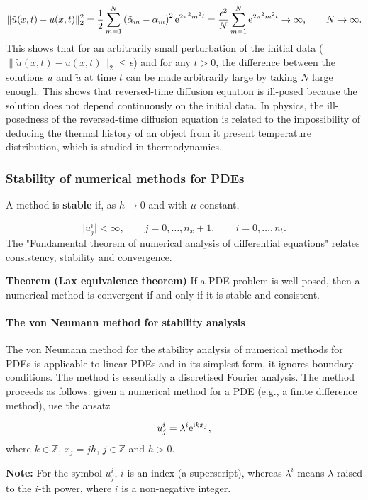 \documentclass[12pt,a4paper]{article}
\begin{document}
\[
\|\tilde{u}(x,t) - u(x,t)\|_2^2 =  \frac{1}{2}\sum_{m=1}^{N} \left(\tilde{\alpha}_m - \alpha_m\right)^2 {\rm e}^{2\pi^2 m^2 t} = \frac{\epsilon^2}{N}\sum_{m=1}^{N} {\rm e}^{2\pi^2 m^2 t} \to \infty, \qquad N\to \infty.
\]
This shows that for an arbitrarily small perturbation of the initial data ($\|\tilde{u}(x,t) - u(x,t)\|_2 \leq \epsilon$) and for any $t > 0$, the difference between the solutions $u$ and $\tilde{u}$ at time $t$ can be made arbitrarily large by taking $N$ large enough. This shows that reversed-time diffusion equation is ill-posed because the solution does not depend continuously on the initial data.  In physics, the ill-posedness of the reversed-time diffusion equation is related to the impossibility of deducing the thermal history of an object from it present temperature distribution, which is studied in thermodynamics.

\subsubsection{Stability of numerical methods for PDEs}
A method is \textbf{stable} if, as $h \to 0$ and with $\mu$ constant,

\[
\vert u^i_j \vert < \infty, \qquad    j = 0, \ldots, n_x+1, \qquad i = 0, \ldots, n_t.
\]
The "Fundamental theorem of numerical analysis of differential equations" relates consistency, stability and convergence.

\textbf{Theorem (Lax equivalence theorem)} If a PDE problem is well posed, then a numerical method is convergent if and only if it is stable and consistent.

\paragraph{The von Neumann method for stability analysis}
The von Neumann method for the stability analysis of numerical methods for PDEs is applicable to linear PDEs and in its simplest form, it ignores boundary conditions. The method is essentially a discretised Fourier analysis.  The method proceeds as follows: given a numerical method for a PDE (e.g., a finite difference method), use the ansatz

\[
u^i_j = \lambda^i {\rm e}^{{\rm i}k x_j},
\]
where $k \in \mathbb{Z}$, $x_j = j h$, $j \in \mathbb{Z}$ and $h > 0$. 

\textbf{Note:} For the symbol $u^i_j$, $i$ is an index (a superscript), whereas $\lambda^i$ means $\lambda$ raised to the $i$-th power, where $i$ is a non-negative integer.  
\end{document}
